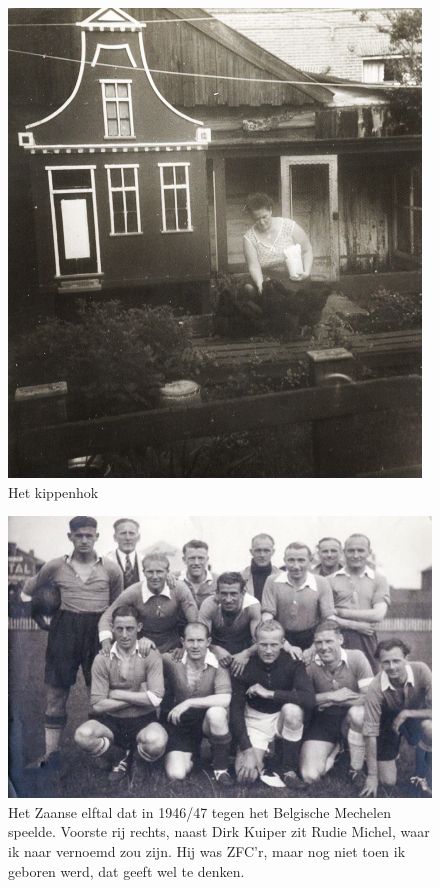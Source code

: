 \documentclass[12pt,twoside, openright]{memoir}
\begin{document}
\begin{figure}
\centering
\includegraphics[width=\textwidth]{img/ch5/kippenhok}
\caption*{\footnotesize Het kippenhok}
\end{figure}

\begin{figure}
\centering
\includegraphics[width=\textwidth]{img/ch5/zaanselftal-2}
\caption*{\footnotesize Het Zaanse elftal dat in 1946/47 tegen het Belgische Mechelen speelde. Voorste rij rechts, naast Dirk Kuiper zit Rudie Michel, waar ik naar vernoemd zou zijn. Hij was ZFC’r, maar nog niet toen ik geboren werd, dat geeft wel te denken.}
\end{figure}
\end{document}
